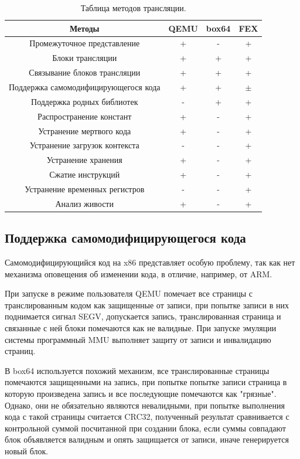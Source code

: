 \begin{table}[!htb]
	\label{table:methods}
	\begin{center}
		\caption{Таблица методов трансляции.}
			\begin{tabular}{|c|c|c|c|}
				\hline
				\bfseries Методы & \bfseries QEMU & \bfseries box64 & \bfseries FEX  \\
				\hline
				Промежуточное представление & + & - & + \\ \hline
				Блоки трансляции & + & + & + \\ \hline
				Связывание блоков трансляции & + & + & + \\ \hline
				Поддержка самомодифицирующегося кода & + & + & $\pm$ \\ \hline
				Поддержка родных библиотек & - & + & + \\ \hline
				Распространение констант & + & - & + \\ \hline
				Устранение мертвого кода & + & - & + \\ \hline
				Устранение загрузок контекста & - & - & + \\ \hline
				Устранение хранения & + & - & + \\ \hline
				Сжатие инструкций & + & - & + \\ \hline
				Устранение временных регистров & - & - & + \\ \hline
				Анализ живости & + & - & + \\ \hline
		\end{tabular}
	\end{center}
\end{table}

\newpage

\subsection{Поддержка самомодифицирующегося кода}

Самомодифицирующийся код на x86 представляет особую проблему, так как нет механизма оповещения об изменении кода, в отличие, например, от ARM.

При запуске в режиме пользователя QEMU помечает все страницы с транслированным кодом как защищенные от записи, при попытке записи в них поднимается сигнал SEGV, допускается запись, транслированная страница и связанные с ней блоки помечаются как не валидные. При запуске эмуляции системы программный MMU выполняет защиту от записи и инвалидацию страниц. \cite{qemu_docs}

В box64 используется похожий механизм, все транслированные страницы помечаются защищенными на запись, при попытке попытке записи страница в которую произведена запись и все последующие помечаются как "грязные". Однако, они не обязательно являются невалидными, при попытке выполнения кода с такой страницы считается CRC32, полученный результат сравнивается с контрольной суммой посчитанной при создании блока, если суммы совпадают блок объявляется валидным и опять защищается от записи, иначе генерируется новый блок. \cite{box64_letter}


